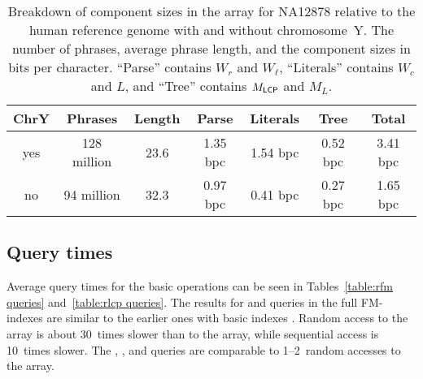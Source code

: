 \begin{table}
\caption{Breakdown of component sizes in the \RLCP{} array for NA12878 relative
to the human reference genome with and without chromosome~Y. The number of phrases,
average phrase length, and the component sizes in bits per character. ``Parse''
contains $W_{r}$ and $W_{\ell}$, ``Literals'' contains $W_{c}$ and $L$, and ``Tree''
contains $M_{\mathsf{LCP}}$ and $M_{L}$.}\label{table:rlcp components}
\setlength{\extrarowheight}{2pt}
\setlength{\tabcolsep}{3pt}
\begin{center}
\begin{tabular}{c|cc|ccc|c}
\hline
\textbf{ChrY} & \textbf{Phrases} & \textbf{Length} & \textbf{Parse} & \textbf{Literals} & \textbf{Tree} & \textbf{Total} \\
\hline
yes           &      128 million &            23.6 &      1.35 bpc &          1.54 bpc &      0.52 bpc &        3.41 bpc \\
no            &       94 million &            32.3 &      0.97 bpc &          0.41 bpc &      0.27 bpc &        1.65 bpc \\
\hline
\end{tabular}
\end{center}
\end{table}

\subsection{Query times}

Average query times for the basic operations can be seen in Tables~\ref{table:rfm
queries} and~\ref{table:rlcp queries}. The results for \LF{} and \Psiop{} queries
in the full FM-indexes are similar to the earlier ones with basic indexes
\cite{Boucher2015}. Random access to the \RLCP{} array is about 30~times
slower than to the \LCP{} array, while sequential access is 10~times slower.
The \nsv, \psv, and \rmq{} queries are comparable to 1\nobreakdash--2~random
accesses to the \RLCP{} array.

